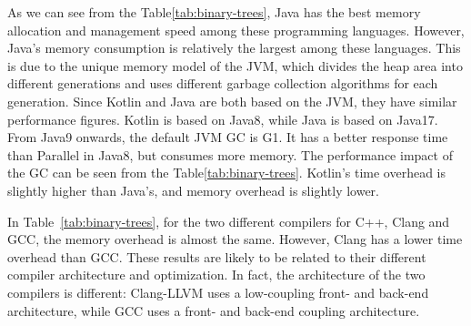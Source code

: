 As we can see from the Table\ref{tab:binary-trees},
Java has the best memory allocation and management
speed among these programming languages.
However, Java's memory consumption is relatively the largest among these languages.
This is due to the unique memory model of the JVM, which divides the heap area into
different generations and uses different garbage collection algorithms for each generation.
Since Kotlin and Java are both based on the JVM, they have similar performance figures.
Kotlin is based on Java8, while Java is based on Java17.
From Java9 onwards, the default JVM GC is G1.
It has a better response time than Parallel in Java8, but consumes more memory.
The performance impact of the GC can be seen from the Table\ref{tab:binary-trees}.
Kotlin's time overhead is slightly higher than Java's, and memory overhead is slightly lower.

In Table~\ref{tab:binary-trees},
for the two different compilers for C++, Clang and GCC, the memory overhead is almost the same.
However, Clang has a lower time overhead than GCC. These results are likely to be related to their
different compiler architecture and optimization.
In fact, the architecture of the two compilers is different:
Clang-LLVM uses a low-coupling front- and back-end architecture, while GCC uses a front- and back-end coupling
architecture.

